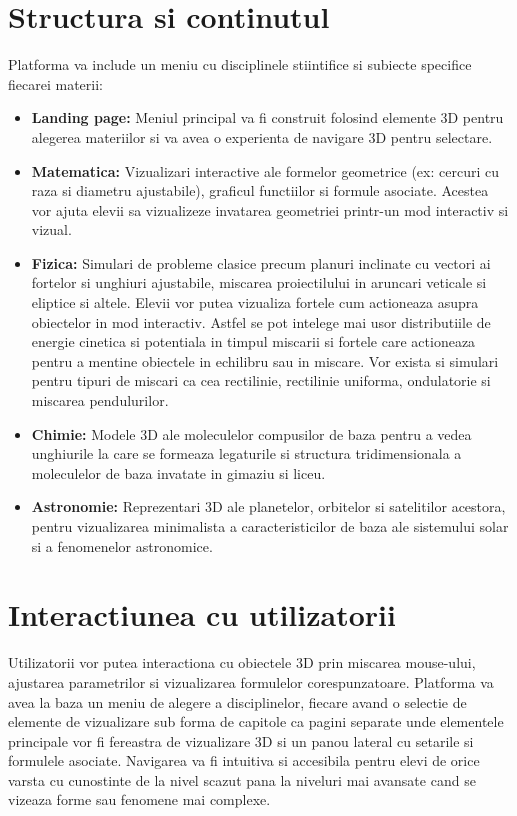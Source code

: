 \documentclass[a4paper,12pt]{article}
\begin{document}
\section*{Structura si continutul}
Platforma va include un meniu cu disciplinele stiintifice si subiecte specifice fiecarei materii:
\begin{itemize}
    \item \textbf{Landing page:} Meniul principal va fi construit folosind elemente 3D pentru alegerea materiilor
    si va avea o experienta de navigare 3D pentru selectare.
    \item \textbf{Matematica:} Vizualizari interactive ale formelor geometrice 
    (ex: cercuri cu raza si diametru ajustabile), graficul functiilor si formule asociate.
    Acestea vor ajuta elevii sa vizualizeze invatarea geometriei printr-un mod interactiv si vizual.
    \item \textbf{Fizica:} Simulari de probleme clasice precum planuri inclinate cu vectori
    ai fortelor si unghiuri ajustabile, miscarea proiectilului in aruncari veticale si eliptice si altele.
    Elevii vor putea vizualiza fortele cum actioneaza asupra obiectelor in mod interactiv. 
    Astfel se pot intelege mai usor distributiile de energie cinetica si potentiala in timpul miscarii
    si fortele care actioneaza pentru a mentine obiectele in echilibru sau in miscare. Vor exista
    si simulari pentru tipuri de miscari ca cea rectilinie, rectilinie uniforma, ondulatorie si miscarea
    pendulurilor.
    \item \textbf{Chimie:} Modele 3D ale moleculelor compusilor de baza pentru a vedea unghiurile
    la care se formeaza legaturile si structura tridimensionala a moleculelor de baza invatate in gimaziu
    si liceu.
    \item \textbf{Astronomie:} Reprezentari 3D ale planetelor, orbitelor si satelitilor acestora,
    pentru vizualizarea minimalista a caracteristicilor de baza ale sistemului solar si a fenomenelor
    astronomice.
\end{itemize}

\section*{Interactiunea cu utilizatorii}
Utilizatorii vor putea interactiona cu obiectele 3D prin miscarea mouse-ului, ajustarea parametrilor
si vizualizarea formulelor corespunzatoare. 
Platforma va avea la baza un meniu de alegere a disciplinelor, fiecare avand o selectie de elemente
de vizualizare sub forma de capitole ca pagini separate unde elementele principale vor fi fereastra
de vizualizare 3D si un panou lateral cu setarile si formulele asociate.
Navigarea va fi intuitiva si accesibila pentru elevi de orice varsta cu cunostinte de la nivel scazut
pana la niveluri mai avansate cand se vizeaza forme sau fenomene mai complexe.
\end{document}
